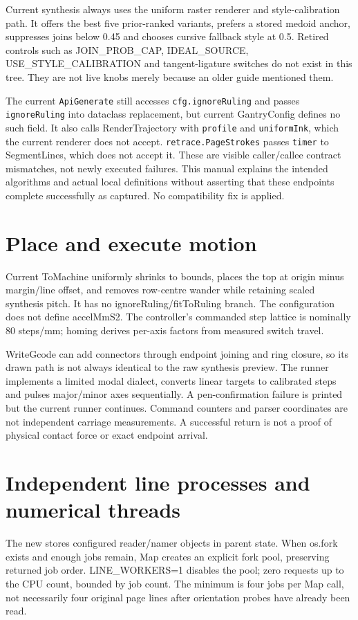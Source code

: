 Current synthesis always uses the uniform raster renderer and style-calibration
path. It offers the best five prior-ranked variants, prefers a stored medoid
anchor, suppresses joins below 0.45 and chooses cursive fallback style at 0.5.
Retired controls such as JOIN\_PROB\_CAP, IDEAL\_SOURCE,
USE\_STYLE\_CALIBRATION and tangent-ligature switches do not exist in this
tree. They are not live knobs merely because an older guide mentioned them.

The current \texttt{ApiGenerate} still accesses \texttt{cfg.ignoreRuling}
and passes \texttt{ignoreRuling} into dataclass replacement, but current
GantryConfig defines no such field. It also calls RenderTrajectory with
\texttt{profile} and \texttt{uniformInk}, which the current renderer does
not accept. \texttt{retrace.PageStrokes} passes \texttt{timer} to
SegmentLines, which does not accept it. These are visible caller/callee
contract mismatches, not newly executed failures. This manual explains the
intended algorithms and actual local definitions without asserting that these
endpoints complete successfully as captured. No compatibility fix is applied.

\section{Place and execute motion}
Current ToMachine uniformly shrinks to bounds, places the top at origin minus
margin/line offset, and removes row-centre wander while retaining scaled
synthesis pitch. It has no ignoreRuling/fitToRuling branch. The configuration
does not define accelMmS2. The controller's commanded step lattice is nominally
80 steps/mm; homing derives per-axis factors from measured switch travel.

WriteGcode can add connectors through endpoint joining and ring closure, so
its drawn path is not always identical to the raw synthesis preview. The
runner implements a limited modal dialect, converts linear targets to
calibrated steps and pulses major/minor axes sequentially. A pen-confirmation
failure is printed but the current runner continues. Command counters and
parser coordinates are not independent carriage measurements. A successful
return is not a proof of physical contact force or exact endpoint arrival.

\section{Independent line processes and numerical threads}
The new  stores configured reader/namer objects in
parent state. When os.fork exists and enough jobs remain, Map creates an
explicit fork pool, preserving returned job order. LINE\_WORKERS=1 disables
the pool; zero requests up to the CPU count, bounded by job count. The minimum
is four jobs per Map call, not necessarily four original page lines after
orientation probes have already been read.

